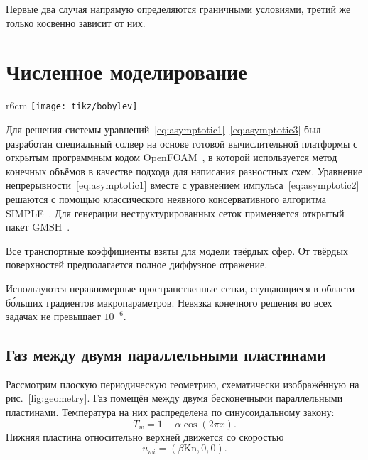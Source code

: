 \documentclass[english,russian,a4paper,10pt]{article}
\newcommand{\Kn}{\mathrm{Kn}}
\begin{document}
Первые два случая напрямую определяются граничными условиями, третий же только косвенно зависит
от них.

\section{Численное моделирование}

\begin{wrapfigure}{r}{6cm}
	\vspace{-20pt}
	\centering
	\texttt{[image: tikz/bobylev]}
	\vspace{-20pt}
	\caption{Геометрия задачи}\label{fig:geometry}
	\vspace{-5pt}
\end{wrapfigure}

Для решения системы уравнений~\eqref{eq:asymptotic1}--\eqref{eq:asymptotic3} был разработан
специальный солвер на основе готовой вычислительной платформы с открытым программным кодом
OpenFOAM\textregistered{}~\cite{Tabor1998}, в которой используется метод конечных объёмов
в качестве подхода для написания разностных схем.
Уравнение непрерывности~\eqref{eq:asymptotic1} вместе с уравнением импульса~\eqref{eq:asymptotic2}
решаются с помощью классического неявного консервативного алгоритма SIMPLE~\cite{Caretto1972}.
Для генерации неструктурированных сеток применяется открытый пакет GMSH~\cite{Geuzaine2009}.

Все транспортные коэффициенты взяты для модели твёрдых сфер.
От твёрдых поверхностей предполагается полное диффузное отражение.

Используются неравномерные пространственные сетки, сгущающиеся в области б\'{о}льших градиентов макропараметров.
Невязка конечного решения во всех задачах не превышает \(10^{-6}\).

\subsection{Газ между двумя параллельными пластинами}

Рассмотрим плоскую периодическую геометрию, схематически изображённую на рис.~\ref{fig:geometry}.
Газ помещён между двумя бесконечными параллельными пластинами.
Температура на них распределена по синусоидальному закону:
\begin{equation}
	T_w = 1-\alpha\cos(2\pi x).
\end{equation}
Нижняя пластина относительно верхней движется со скоростью
\begin{equation}
	u_{wi} = (\beta \Kn,0,0).
\end{equation}
\end{document}
